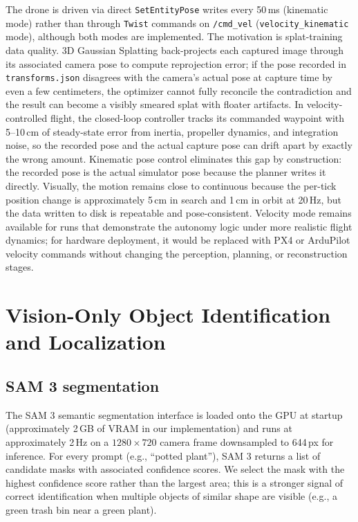 \documentclass[conference]{IEEEtran}
\begin{document}
The drone is driven via direct \texttt{SetEntityPose} writes every
50\,ms (kinematic mode) rather than through \texttt{Twist} commands on
\texttt{/cmd\_vel} (\texttt{velocity\_kinematic} mode), although both
modes are implemented. The motivation is splat-training data quality.
3D Gaussian Splatting back-projects each captured image through its
associated camera pose to compute reprojection error; if the pose
recorded in \texttt{transforms.json} disagrees with the camera's actual
pose at capture time by even a few centimeters, the optimizer cannot
fully reconcile the contradiction and the result can become a visibly
smeared splat with floater artifacts. In velocity-controlled flight,
the closed-loop controller tracks its commanded waypoint with
5--10\,cm of steady-state error from inertia, propeller dynamics, and
integration noise, so the recorded pose and the actual capture pose
can drift apart by exactly the wrong amount. Kinematic pose control
eliminates this gap by construction: the recorded pose is the actual
simulator pose because the planner writes it directly. Visually, the
motion remains close to continuous because the per-tick position
change is approximately 5\,cm in search and 1\,cm in orbit at 20\,Hz,
but the data written to disk is repeatable and pose-consistent.
Velocity mode remains available for runs that demonstrate the autonomy
logic under more realistic flight dynamics; for hardware deployment,
it would be replaced with PX4 or ArduPilot velocity commands without
changing the perception, planning, or reconstruction stages.

\section{Vision-Only Object Identification and Localization}
\label{sec:vision}

\subsection{SAM 3 segmentation}

The SAM 3 semantic segmentation interface is loaded onto the GPU at
startup (approximately 2\,GB of VRAM in our implementation) and
runs at approximately 2\,Hz on a $1280\!\times\!720$ camera frame
downsampled to 644\,px for inference. For every prompt
(e.g., ``potted plant''), SAM 3 returns a list of candidate masks
with associated confidence scores. We select the mask with the
highest confidence score rather than the largest area; this is a
stronger signal of correct identification when multiple objects of
similar shape are visible (e.g., a green trash bin near a green
plant).
\end{document}
